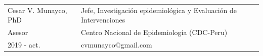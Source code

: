 \documentclass[margin,line]{res}
\begin{document}
\begin{resume}
		\begin{tabular}{ l l }
			Cesar V. Munayco, PhD & Jefe, Investigación epidemiológica y Evaluación de Intervenciones\\
			Asesor & Centro Nacional de Epidemiología (CDC-Peru)\\
			2019 - act. & cvmunayco@gmail.com\\ %
			
			
		\end{tabular}
		
		
		

\end{resume}
\end{document}
